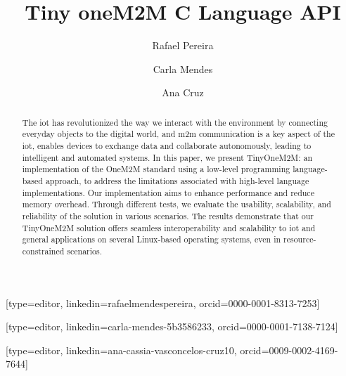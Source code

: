 \documentclass[a4paper,fleqn]{cas-dc}
\begin{document}
\let\WriteBookmarks\relax
\def\floatpagepagefraction{1}
\def\textpagefraction{.001}

\title [mode = title]{Tiny oneM2M C Language API}


\author[1]{Rafael Pereira}[type=editor,
                        linkedin=rafaelmendespereira,
                        orcid=0000-0001-8313-7253]

\author[1]{Carla Mendes}[type=editor,
                        linkedin=carla-mendes-5b3586233,
                        orcid=0000-0001-7138-7124]

\author[1]{Ana Cruz}[type=editor,
linkedin=ana-cassia-vasconcelos-cruz10,
orcid=0009-0002-4169-7644]

\address[1]{Computer Science and Communications Research Centre, School of Technology and Management, Polytechnic of Leiria, 2411-901 Leiria, Portugal}

\begin{abstract}
 The \gls{iot} has revolutionized the way we interact with the environment by connecting everyday objects to the digital world, and \gls{m2m} communication is a key aspect of the \gls{iot}, enables devices to exchange data and collaborate autonomously, leading to intelligent and automated systems. 
 In this paper, we present TinyOneM2M: an implementation of the OneM2M standard using a low-level programming language-based approach, to address the limitations associated with high-level language implementations. Our implementation aims to enhance performance and reduce memory overhead. Through different tests, we evaluate the usability, scalability, and reliability of the solution in various scenarios. 
 The results demonstrate that our TinyOneM2M solution offers seamless interoperability and scalability to \gls{iot} and general applications on several Linux-based operating systems, even in resource-constrained scenarios.

\end{abstract}

%
\end{document}
